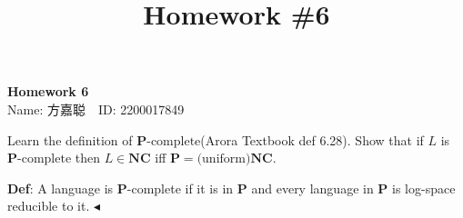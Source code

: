 \documentclass[11pt]{article}
\title{Homework \#6}
\newcommand{\mP}{\mathbf{P}}
\newcommand{\mPC}{\mathbf{P}\text{-complete}}
\newcommand{\NC}{\mathbf{NC}}
\newcommand{\1}{\mathbf{1}}
\newenvironment{problem}[2][Problem]{\begin{trivlist}
\item[\hskip \labelsep{\bfseries#1}\hskip\labelsep{\bfseries#2.}]}{\hfill$\blacktriangleleft$\end{trivlist}}
\begin{document}
\kaishu

\pagestyle{fancy}
\chead{}

\begin{center}
    {\LARGE \bf Homework 6}\\
    {Name: 方嘉聪\ \  ID: 2200017849}            %
\end{center}

\begin{problem}{1.(12 points)}
    Learn the definition of $\mPC$(Arora Textbook def 6.28). Show that if $L$ is $\mPC$ then $L \in \NC$ iff $\mP = \text{(uniform)}\NC$.
    
    \textbf{Def}: A language is $\mP$-complete if it is in $\mP$ and every language in $\mP$ is log-space reducible to it.
\end{problem}
\end{document}
